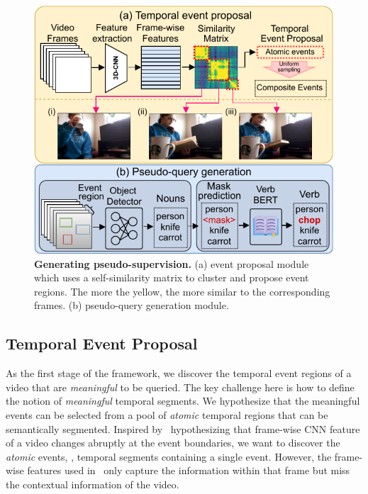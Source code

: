 \begin{figure}[t]
    \centering
    \includegraphics[width=0.95\linewidth]{figures/datagen.pdf}
    \caption{\textbf{Generating pseudo-supervision.} (a) event proposal module which uses a self-similarity matrix to cluster and propose event regions. The more the yellow, the more similar to the corresponding frames. (b) pseudo-query generation module.}
    \vspace{-0.7em}
    \label{fig:datagen}
\end{figure}


\subsection{Temporal Event Proposal}
\label{sec:approach:eventproposal}
As the first stage of the framework, we discover the temporal event regions of a video that are \emph{meaningful} to be queried.
The key challenge here is how to define the notion of \emph{meaningful} temporal segments.
We hypothesize that the meaningful events can be selected from a pool of \emph{atomic} temporal regions that can be semantically segmented.
Inspired by~\cite{jain2020actionbytes} hypothesizing that frame-wise CNN feature of a video changes abruptly at the event boundaries, we want to discover the \emph{atomic} events, \ie, temporal segments containing a single event.
However, the frame-wise features used in~\cite{jain2020actionbytes} only capture the information within that frame but miss the contextual information of the video. 

